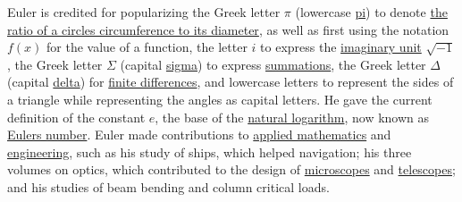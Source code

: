 Euler is credited for popularizing the Greek letter {{\(\pi\)}{}} (lowercase \href{https://en.wikipedia.org/wiki/Pi_(letter)}{pi}) to denote \href{https://en.wikipedia.org/wiki/Pi}{the ratio of a circle\textquotesingle s circumference to its diameter}, as well as first using the notation {{\(f(x)\)}{}} for the value of a function, the letter \href{https://en.wikipedia.org/wiki/I}{{{\(i\)}{}}} to express the \href{https://en.wikipedia.org/wiki/Imaginary_unit}{imaginary unit} {{\(\sqrt{- 1}\)}{}}, the Greek letter {{\(\Sigma\)}{}} (capital \href{https://en.wikipedia.org/wiki/Sigma}{sigma}) to express \href{https://en.wikipedia.org/wiki/Summation}{summations}, the Greek letter {{\(\Delta\)}{}} (capital \href{https://en.wikipedia.org/wiki/Delta_(letter)}{delta}) for \href{https://en.wikipedia.org/wiki/Finite_difference}{finite differences}, and lowercase letters to represent the sides of a triangle while representing the angles as capital letters. He gave the current definition of the constant {{\(e\)}{}}, the base of the \href{https://en.wikipedia.org/wiki/Natural_logarithm}{natural logarithm}, now known as \href{https://en.wikipedia.org/wiki/Euler's_number}{Euler\textquotesingle s number}. Euler made contributions to \href{https://en.wikipedia.org/wiki/Applied_mathematics}{applied mathematics} and \href{https://en.wikipedia.org/wiki/Engineering}{engineering}, such as his study of ships, which helped navigation; his three volumes on optics, which contributed to the design of \href{https://en.wikipedia.org/wiki/Microscope}{microscopes} and \href{https://en.wikipedia.org/wiki/Telescope}{telescopes}; and his studies of beam bending and column critical loads.


